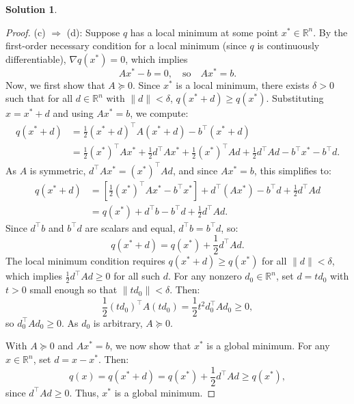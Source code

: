 \documentclass[12pt]{article}
\theoremstyle{definition}
\newtheorem*{solution}{\normalfont\textbf{Solution}}
\begin{document}
\begin{enumerate}[leftmargin=*]
\begin{solution}
\begin{proof}
            \noindent
            (c) \(\Rightarrow\) (d): Suppose \( q \) has a local minimum at some point \( x^* \in \mathbb{R}^n \). By the first-order necessary condition for a local minimum (since \( q \) is continuously differentiable), \( \nabla q(x^*) = 0 \), which implies
            \[
            A x^* - b = 0, \quad \text{so} \quad A x^* = b.
            \]
            Now, we first show that \( A \succeq 0 \). Since \( x^* \) is a local minimum, there exists \( \delta > 0 \) such that for all \( d \in \mathbb{R}^n \) with \( \|d\| < \delta \), \( q(x^* + d) \geq q(x^*) \). Substituting \( x = x^* + d \) and using \( A x^* = b \), we compute:
            \begin{align*}
            q(x^* + d) &= \frac{1}{2} (x^* + d)^\top A (x^* + d) - b^\top (x^* + d) \\
            &= \frac{1}{2} (x^*)^\top A x^* + \frac{1}{2} d^\top A x^* + \frac{1}{2} (x^*)^\top A d + \frac{1}{2} d^\top A d - b^\top x^* - b^\top d.
            \end{align*}
            As \( A \) is symmetric, \( d^\top A x^* = (x^*)^\top A d \), and since \( A x^* = b \), this simplifies to:
            \begin{align*}
            q(x^* + d) &= \left[ \frac{1}{2} (x^*)^\top A x^* - b^\top x^* \right] + d^\top (A x^*) - b^\top d + \frac{1}{2} d^\top A d \\
            &= q(x^*) + d^\top b - b^\top d + \frac{1}{2} d^\top A d.
            \end{align*}
            Since \( d^\top b \) and \( b^\top d \) are scalars and equal, \( d^\top b = b^\top d \), so:
            \[
            q(x^* + d) = q(x^*) + \frac{1}{2} d^\top A d.
            \]
            The local minimum condition requires \( q(x^* + d) \geq q(x^*) \) for all \( \|d\| < \delta \), which implies \( \frac{1}{2} d^\top A d \geq 0 \) for all such \( d \). For any nonzero \( d_0 \in \mathbb{R}^n \), set \( d = t d_0 \) with \( t > 0 \) small enough so that \( \|t d_0\| < \delta \). Then:
            \[
            \frac{1}{2} (t d_0)^\top A (t d_0) = \frac{1}{2} t^2 d_0^\top A d_0 \geq 0,
            \]
            so \( d_0^\top A d_0 \geq 0 \). As \( d_0 \) is arbitrary, \( A \succeq 0 \).

            With \( A \succeq 0 \) and \( A x^* = b \), we now show that \( x^* \) is a global minimum. For any \( x \in \mathbb{R}^n \), set \( d = x - x^* \). Then:
            \[
            q(x) = q(x^* + d) = q(x^*) + \frac{1}{2} d^\top A d \geq q(x^*),
            \]
            since \( d^\top A d \geq 0 \). Thus, \( x^* \) is a global minimum.


\end{proof}
\end{solution}
\end{enumerate}
\end{document}

